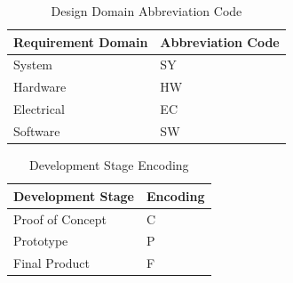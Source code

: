 \bgroup
\def\arraystretch{1.5}
\begin{table}[H]
\centering
\begin{tabular}{ | m{7cm} | m{7cm}| } 
\hline
\rowcolor{lightgray} \textbf{Requirement Domain} & \textbf{Abbreviation Code} \\ 
\hline
 System & SY\\ 
\hline
 Hardware & HW\\ 
\hline
 Electrical & EC\\  
\hline
 Software & SW\\ 
\hline
\end{tabular}
\caption{Design  Domain Abbreviation Code}
\end{table}

\bgroup
\def\arraystretch{1.5}
\begin{table}[H]
\centering
\begin{tabular}{ | m{7cm} | m{7cm}| }
\hline
\rowcolor{lightgray} \textbf{Development Stage} & \textbf{Encoding} \\
\hline
Proof of Concept & C\\
\hline
Prototype & P\\
\hline
Final Product & F\\
\hline
\end{tabular}
\caption{Development Stage Encoding}
\end{table}	












